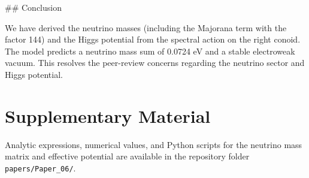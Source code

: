 \documentclass[11pt,a4paper]{article}
\begin{document}
## Conclusion

We have derived the neutrino masses (including the Majorana term with the factor 144) and the Higgs potential from the spectral action on the right conoid. The model predicts a neutrino mass sum of 0.0724 eV and a stable electroweak vacuum. This resolves the peer-review concerns regarding the neutrino sector and Higgs potential.

\section{Supplementary Material}

Analytic expressions, numerical values, and Python scripts for the neutrino mass matrix and effective potential are available in the repository folder \texttt{papers/Paper_06/}.
\end{document}
